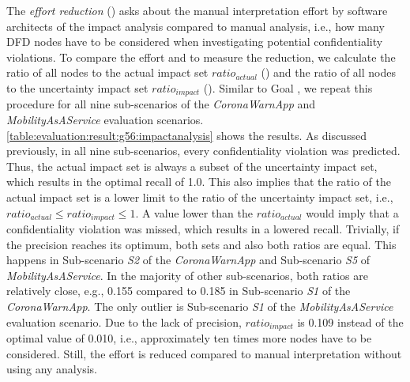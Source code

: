 The \emph{effort reduction} () asks about the manual interpretation effort by software architects of the impact analysis compared to manual analysis, i.e., how many \ac{DFD} nodes have to be considered when investigating potential confidentiality violations.
To compare the effort and to measure the reduction, we calculate the ratio of all nodes to the actual impact set $ratio_{actual}$ () and the ratio of all nodes to the uncertainty impact set $ratio_{impact}$ ().
Similar to Goal , we repeat this procedure for all nine sub-scenarios of the \emph{CoronaWarnApp} and \emph{MobilityAsAService} evaluation scenarios.
\autoref{table:evaluation:result:g56:impactanalysis} shows the results.
As discussed previously, in all nine sub-scenarios, every confidentiality violation was predicted.
Thus, the actual impact set is always a subset of the uncertainty impact set, which results in the optimal recall of 1.0.
This also implies that the ratio of the actual impact set is a lower limit to the ratio of the uncertainty impact set, i.e., $ratio_{actual} \leq ratio_{impact} \leq 1$.
A value lower than the $ratio_{actual}$ would imply that a confidentiality violation was missed, which results in a lowered recall.
Trivially, if the precision reaches its optimum, both sets and also both ratios are equal.
This happens in Sub-scenario \emph{S2} of the \emph{CoronaWarnApp} and Sub-scenario \emph{S5} of \emph{MobilityAsAService}.
In the majority of other sub-scenarios, both ratios are relatively close, e.g., 0.155 compared to 0.185 in Sub-scenario \emph{S1} of the \emph{CoronaWarnApp}.
The only outlier is Sub-scenario \emph{S1} of the \emph{MobilityAsAService} evaluation scenario.
Due to the lack of precision, $ratio_{impact}$ is 0.109 instead of the optimal value of 0.010, i.e., approximately ten times more nodes have to be considered.
Still, the effort is reduced compared to manual interpretation without using any analysis.

